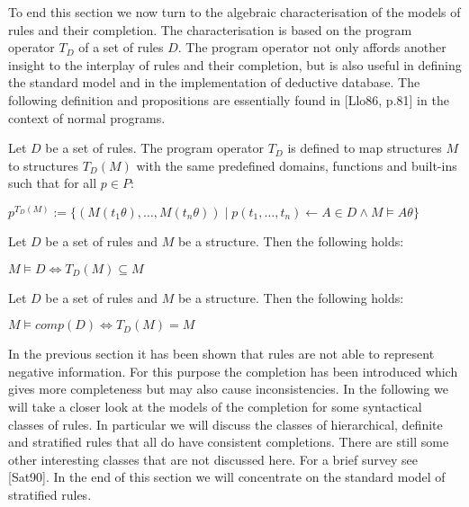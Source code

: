 To end this section we now turn to the algebraic characterisation of the models of rules
and their completion. The characterisation is based on the program operator $T_D$ of a set
of rules $D$. The program operator not only affords another insight to the interplay of rules 
and their completion, but is also useful in defining the standard model and in the implementation 
of deductive database. The following definition and propositions are essentially found in [Llo86,
p.81] in the context of normal programs.

\begin{Def} Let $D$ be a set of rules. The program operator $T_D$ is defined to map structures 
$M$ to structures $T_D(M)$ with the same predefined domains, functions and built-ins such that 
for all $p \in P$:

\begin{center}
$p^{T_D(M)} := \{ (M(t_1\theta),\ldots,M(t_n\theta)) \; | \;
p(t_1,\ldots,t_n)\!\leftarrow\!A \in D \wedge M\!\models\!A\theta \}$
\end{center}
\end{Def}

\begin{Pro} Let $D$ be a set of rules and $M$ be a structure. Then the
following holds:

\begin{center}
$M \models D \Longleftrightarrow T_D(M) \subseteq M$
\end{center}
\end{Pro}

\begin{Pro} Let $D$ be a set of rules and $M$ be a structure. Then the
following holds:

\begin{center}
$M \models comp(D) \Longleftrightarrow T_D(M) = M$
\end{center}
\end{Pro}

\label{secstdm}
In the previous section it has been shown that rules are not able to represent negative 
information. For this purpose the completion has been introduced which gives more completeness
but may also cause inconsistencies. In the following we will take a closer look at the
models of the completion for some syntactical classes of rules. In particular we will discuss
the classes of hierarchical, definite and stratified rules that all do have consistent
completions. There are still some other interesting classes that are not discussed
here. For a brief survey see [Sat90]. In the end of this section we will concentrate on 
the standard model of stratified rules. 

